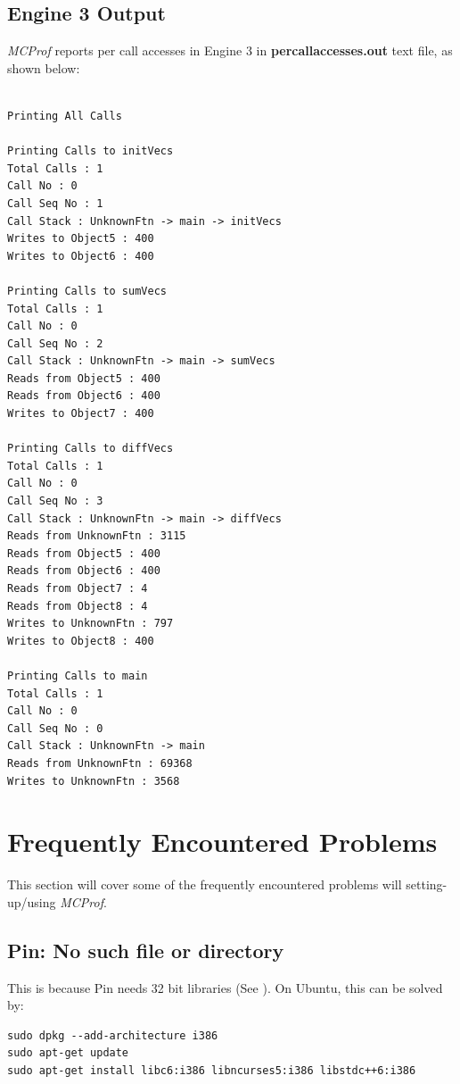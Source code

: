 \documentclass[10pt]{article}
\newcommand{\MCPROF}{\emph{MCProf}}
\begin{document}
\subsection{Engine 3 Output}

\MCPROF{} reports per call accesses in Engine 3 in \textbf{percallaccesses.out}
text file, as shown below:

{
\scriptsize
\begin{Verbatim}[frame=single]

Printing All Calls

Printing Calls to initVecs
Total Calls : 1
Call No : 0
Call Seq No : 1
Call Stack : UnknownFtn -> main -> initVecs
Writes to Object5 : 400
Writes to Object6 : 400

Printing Calls to sumVecs
Total Calls : 1
Call No : 0
Call Seq No : 2
Call Stack : UnknownFtn -> main -> sumVecs
Reads from Object5 : 400
Reads from Object6 : 400
Writes to Object7 : 400

Printing Calls to diffVecs
Total Calls : 1
Call No : 0
Call Seq No : 3
Call Stack : UnknownFtn -> main -> diffVecs
Reads from UnknownFtn : 3115
Reads from Object5 : 400
Reads from Object6 : 400
Reads from Object7 : 4
Reads from Object8 : 4
Writes to UnknownFtn : 797
Writes to Object8 : 400

Printing Calls to main
Total Calls : 1
Call No : 0
Call Seq No : 0
Call Stack : UnknownFtn -> main
Reads from UnknownFtn : 69368
Writes to UnknownFtn : 3568
\end{Verbatim}
}


\section{Frequently Encountered Problems}
\label{sec:faq}

This section will cover some of the frequently encountered problems will
setting-up/using \MCPROF{}.

\subsection{Pin: No such file or directory}
This is because Pin needs 32 bit libraries (See \cite{PinLibs32}).
On Ubuntu, this can be solved by:
{
\small
\begin{Verbatim}[frame=single, samepage=true]
sudo dpkg --add-architecture i386
sudo apt-get update
sudo apt-get install libc6:i386 libncurses5:i386 libstdc++6:i386
\end{Verbatim}
}
\end{document}
